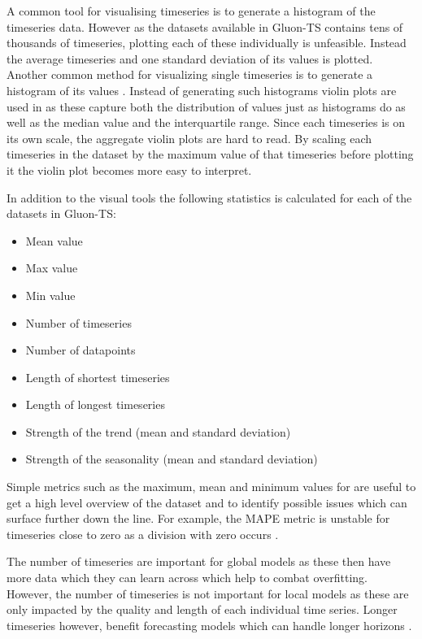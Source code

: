 A common tool for visualising timeseries is to generate a histogram of the timeseries data. However as the datasets available in Gluon-TS contains tens of thousands of timeseries, plotting each of these individually is unfeasible. Instead the average timeseries and one standard deviation of its values is plotted. Another common method for visualizing single timeseries is to generate a histogram of its values \cite{hyndman_forecasting_3rd}. Instead of generating such histograms violin plots are used in as these capture both the distribution of values just as histograms do as well as the median value and the interquartile range. Since each timeseries is on its own scale, the aggregate violin plots are hard to read. By scaling each timeseries in the dataset by the maximum value of that timeseries before plotting it the violin plot becomes more easy to interpret.

In addition to the visual tools the following statistics is calculated for each of the datasets in Gluon-TS:

\begin{itemize}
  \item Mean value
  \item Max value
  \item Min value
  \item Number of timeseries
  \item Number of datapoints
  \item Length of shortest timeseries
  \item Length of longest timeseries
  \item Strength of the trend (mean and standard deviation)
  \item Strength of the seasonality (mean and standard deviation)
\end{itemize}

Simple metrics such as the maximum, mean and minimum values for are useful to get a high level overview of the dataset and to identify possible issues which can surface further down the line. For example, the MAPE metric is unstable for timeseries close to zero as a division with zero occurs \cite{hyndman_forecasting_3rd}.

The number of timeseries are important for global models as these then have more data which they can learn across which help to combat overfitting. However, the number of timeseries is not important for local models as these are only impacted by the quality and length of each individual time series. Longer timeseries however, benefit forecasting models which can handle longer horizons \cite{makridakis_m4_2020}.

